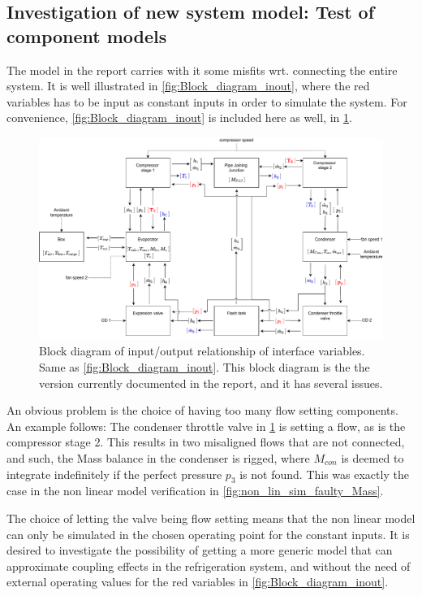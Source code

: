 \subsection{Investigation of new system model: Test of component models} \label{app:tj_2}
The model in the report carries with it some misfits wrt. connecting the entire system. It is well illustrated in \cref{fig:Block_diagram_inout}, where the red variables has to be input as constant inputs in order to simulate the system. For convenience, \cref{fig:Block_diagram_inout} is included here as well, in \cref{fig:Block_diagram_inout2}.
\begin{figure}[h!]
	\centering
	\includegraphics[width=1\textwidth]{Graphics/Block_Diagram_inout_flowValveVersion.pdf}
	\caption{Block diagram of input/output relationship of interface variables. Same as \cref{fig:Block_diagram_inout}. This block diagram is the the version currently documented in the report, and it has several issues.}
	\label{fig:Block_diagram_inout2}
\end{figure}

An obvious problem is the choice of having too many flow setting components. An example follows: The condenser throttle valve in \cref{fig:Block_diagram_inout2} is setting a flow, as is the compressor stage 2. This results in two misaligned flows that are not connected, and such, the Mass balance in the condenser is rigged, where $ M_{con} $ is deemed to integrate indefinitely if the perfect pressure $ p_3 $ is not found. This was exactly the case in the non linear model verification in \cref{fig:non_lin_sim_faulty_Mass}.

The choice of letting the valve being flow setting means that the non linear model can only be simulated in the chosen operating point for the constant inputs. It is desired to investigate the possibility of getting a more generic model that can approximate coupling effects in the refrigeration system, and without the need of external operating values for the red variables in \cref{fig:Block_diagram_inout}.

